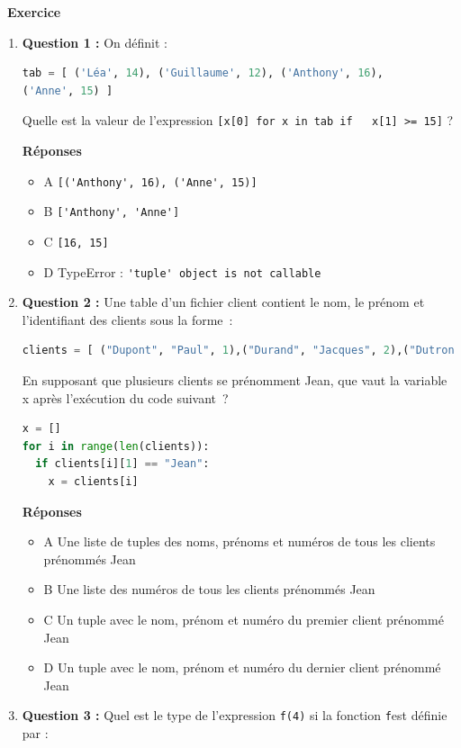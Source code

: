 \documentclass[
  11pt,
]{article}
\newcommand{\passthrough}[1]{#1}
\newcounter{exo}
\newenvironment{exercice}[1]
{\par \medskip   \addtocounter{exo}{1} \noindent  
\begin{bclogo}[arrondi =0.1,   noborder = true, logo=\bccrayon, marge=4]{~\textbf{Exercice} \textbf{\theexo} {\itshape #1} }  \par}
{
\end{bclogo}
 \par \bigskip }
\newcounter{def}
\begin{document}
\begin{exercice}{}

\begin{enumerate}
\def\labelenumi{\arabic{enumi}.}
\item
  \textbf{Question 1 :} On définit :

\begin{lstlisting}[language=Python]
tab = [ ('Léa', 14), ('Guillaume', 12), ('Anthony', 16),
('Anne', 15) ]
\end{lstlisting}

  Quelle est la valeur de l'expression
  \passthrough{\lstinline![x[0] for x in tab if   x[1] >= 15]!} ?

  \textbf{Réponses}

  \begin{itemize}
  \item
    A \passthrough{\lstinline![('Anthony', 16), ('Anne', 15)]!}
  \item
    B \passthrough{\lstinline!['Anthony', 'Anne']!}
  \item
    C \passthrough{\lstinline![16, 15]!}
  \item
    D TypeError :
    \passthrough{\lstinline!'tuple' object is not callable!}
  \end{itemize}
\item
  \textbf{Question 2 :} Une table d'un fichier client contient le nom,
  le prénom et l'identifiant des clients sous la forme~:

\begin{lstlisting}[language=Python]
clients = [ ("Dupont", "Paul", 1),("Durand", "Jacques", 2),("Dutronc", "Jean", 3),...]
\end{lstlisting}

  En supposant que plusieurs clients se prénomment Jean, que vaut la
  variable x après l'exécution du code suivant~?

\begin{lstlisting}[language=Python]
x = []
for i in range(len(clients)):
  if clients[i][1] == "Jean":
    x = clients[i]
\end{lstlisting}

  \textbf{Réponses}

  \begin{itemize}
  \item
    A Une liste de tuples des noms, prénoms et numéros de tous les
    clients prénommés Jean
  \item
    B Une liste des numéros de tous les clients prénommés Jean
  \item
    C Un tuple avec le nom, prénom et numéro du premier client prénommé
    Jean
  \item
    D Un tuple avec le nom, prénom et numéro du dernier client prénommé
    Jean
  \end{itemize}
\item
  \textbf{Question 3 :} Quel est le type de l'expression
  \passthrough{\lstinline!f(4)!} si la fonction
  \passthrough{\lstinline!f!}est définie par :


\end{enumerate}
\end{exercice}
\end{document}
